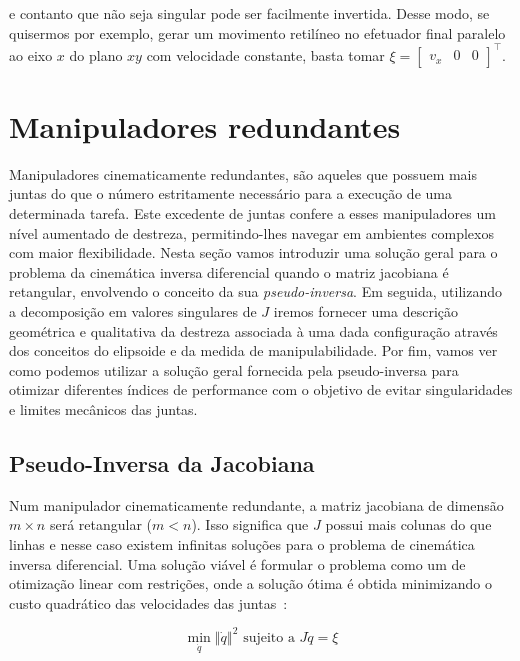 e contanto que não seja singular pode ser facilmente invertida. Desse modo, se
quisermos por exemplo, gerar um movimento retilíneo no efetuador final paralelo
ao eixo \(x\) do plano \(xy\) com velocidade constante, basta tomar \(\xi = \begin{bmatrix}
    v_x & 0 & 0
\end{bmatrix}^\top\).

\section{Manipuladores redundantes}

Manipuladores cinematicamente redundantes, são aqueles que possuem mais juntas
do que o número estritamente necessário para a execução de uma determinada
tarefa. Este excedente de juntas confere a esses manipuladores um nível
aumentado de destreza, permitindo-lhes navegar em ambientes complexos com maior
flexibilidade. Nesta seção vamos introduzir uma solução geral para o problema
da cinemática inversa diferencial quando o matriz jacobiana é retangular,
envolvendo o conceito da sua \emph{pseudo-inversa}. Em seguida, utilizando a
decomposição em valores singulares de \(J\) iremos fornecer uma descrição
geométrica e qualitativa da destreza associada à uma dada configuração através
dos conceitos do elipsoide e da medida de manipulabilidade. Por fim, vamos ver
como podemos utilizar a solução geral fornecida pela pseudo-inversa para
otimizar diferentes índices de performance com o objetivo de evitar
singularidades e limites mecânicos das juntas.

\subsection{Pseudo-Inversa da Jacobiana}

Num manipulador cinematicamente redundante, a matriz jacobiana de dimensão \(m
\times n\) será retangular (\(m < n\)). Isso significa que \(J\) possui mais
colunas do que linhas e nesse caso existem infinitas soluções para o problema
de cinemática inversa diferencial. Uma solução viável é formular o problema como 
um de otimização linear com restrições, onde a solução ótima é obtida minimizando 
o custo quadrático das velocidades das juntas~\cite{siciliano_robotics_2009}:

\begin{equation}
    \min_{\dot{q}} \left\Vert \dot{q} \right\Vert^2 \text{ sujeito a } J \dot{q} = \xi
\end{equation}

